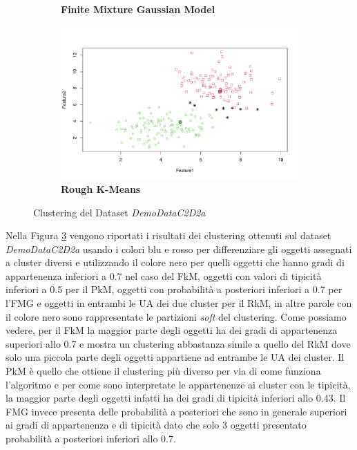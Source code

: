 \documentclass[12pt]{article}
\begin{document}
\begin{figure}[h]
\begin{subfigure}[h]{0.49\textwidth}
		\caption{\textbf{Finite Mixture Gaussian Model}}
		\label{fig:DemoDataC2D2a_mclust}
	\end{subfigure}
	\begin{subfigure}[h]{0.49\textwidth}
		\centering
		\includegraphics[width=\textwidth]{DemoDataC2D2a_rkm}
		\caption{\textbf{Rough K-Means}}
		\label{fig:DemoDataC2D2a_rkm}
	\end{subfigure}
	\caption{Clustering del Dataset \textit{DemoDataC2D2a}}
	\label{fig:DemoDataC2D2a}
\end{figure}

Nella Figura \ref{fig:DemoDataC2D2a} vengono riportati i risultati dei clustering ottenuti sul dataset \textit{DemoDataC2D2a} usando i colori blu e rosso per differenziare gli oggetti assegnati a cluster diversi e utilizzando il colore nero per quelli oggetti che hanno gradi di appartenenza inferiori a 0.7 nel caso del FkM, oggetti con valori di tipicità inferiori a 0.5 per il PkM, oggetti con probabilità a posteriori inferiori a 0.7 per l'FMG e oggetti in entrambi le UA dei due cluster per il RkM, in altre parole con il colore nero sono rappresentate le partizioni \textit{soft} del clustering. Come possiamo vedere, per il FkM la maggior parte degli oggetti ha dei gradi di appartenenza superiori allo 0.7 e mostra un clustering abbastanza simile a quello del RkM dove solo una piccola parte degli oggetti appartiene ad entrambe le UA dei cluster. Il PkM è quello che ottiene il clustering più diverso per via di come funziona l'algoritmo e per come sono interpretate le appartenenze ai cluster con le tipicità, la maggior parte degli oggetti infatti ha dei gradi di tipicità inferiori allo 0.43. Il FMG invece presenta delle probabilità a posteriori che sono in generale superiori ai gradi di appartenenza e di tipicità dato che solo 3 oggetti presentato probabilità a posteriori inferiori allo 0.7.
\end{document}
